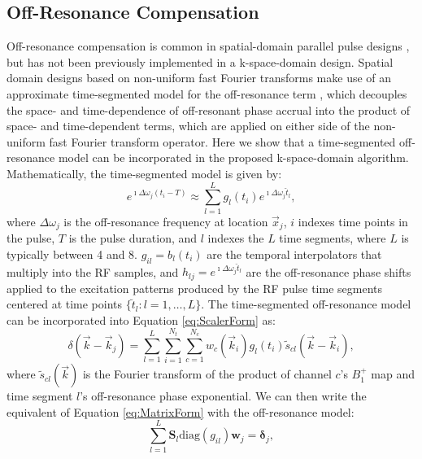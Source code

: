 \subsection*{Off-Resonance Compensation}
Off-resonance compensation is common in spatial-domain parallel pulse designs \cite{Grissom:2006:MRM}, 
but has not been previously implemented in a k-space-domain design.
Spatial domain designs based on non-uniform fast Fourier transforms make use of an approximate time-segmented
model for the off-resonance term \cite{fessler2005toeplitz},
which decouples the space- and time-dependence of off-resonant phase accrual into the product of 
space- and time-dependent terms, which are applied on either side of the non-uniform fast Fourier transform operator. 
Here we show that a time-segmented off-resonance model can be incorporated in the proposed k-space-domain algorithm. 
Mathematically, the time-segmented model is given by:
\begin{equation}
e^{\imath \Delta\omega_j (t_i-T) }\approx\sum_{l=1}^{L} g_l(t_i) e^{\imath \Delta\omega_j \breve{t}_l},
\end{equation}
where $\Delta\omega_j$ is the off-resonance frequency at location $\vec{x}_j$, 
$i$ indexes time points in the pulse, 
$T$ is the pulse duration,
and $l$ indexes the $L$ time segments, where $L$ is typically between 4 and 8. 
$g_{il}=b_{l}(t_i)$ are the temporal interpolators that multiply into the RF samples,
and $h_{lj}=e^{\imath \Delta\omega_j\breve{t}_l}$ are the off-resonance phase shifts 
applied to the excitation patterns produced by the RF pulse time segments centered at time points $\{\breve{t}_l: l = 1, \dots, L\}$.
The time-segmented off-resonance model can be incorporated into Equation \ref{eq:ScalerForm} as:
\begin{equation}
	\delta(\vec{k}-\vec{k}_j)=\sum_{l = 1}^L \sum_{i=1}^{N_t}\sum_{c=1}^{N_c} w_c(\vec{k}_i) g_l(t_i) \tilde{s}_{cl} (\vec{k}-\vec{k}_i), 
\end{equation}
where $\tilde{s}_{cl}(\vec{k})$ is the Fourier transform of the product of channel $c$'s $B_1^+$ map and time segment $l$'s 
off-resonance phase exponential. 
We can then write the equivalent of Equation \ref{eq:MatrixForm} with the off-resonance model:
\begin{equation}
	\sum_{l=1}^L \bm{S}_l \textrm{diag}(g_{il}) \bm{w}_j = \bm{\delta}_j,
\end{equation} 
